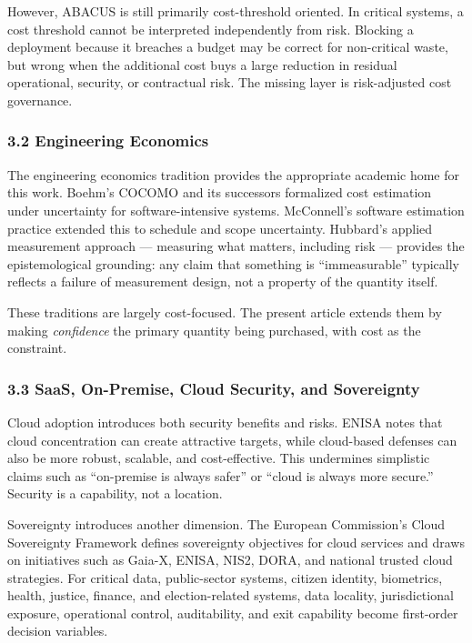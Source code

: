 \documentclass[
]{article}
\begin{document}
However, ABACUS is still primarily cost-threshold oriented. In critical
systems, a cost threshold cannot be interpreted independently from risk.
Blocking a deployment because it breaches a budget may be correct for
non-critical waste, but wrong when the additional cost buys a large
reduction in residual operational, security, or contractual risk. The
missing layer is risk-adjusted cost governance.

\subsubsection{3.2 Engineering Economics}\label{engineering-economics}

The engineering economics tradition provides the appropriate academic
home for this work. Boehm's COCOMO and its successors formalized cost
estimation under uncertainty for software-intensive systems. McConnell's
software estimation practice extended this to schedule and scope
uncertainty. Hubbard's applied measurement approach --- measuring what
matters, including risk --- provides the epistemological grounding: any
claim that something is ``immeasurable'' typically reflects a failure of
measurement design, not a property of the quantity itself.

These traditions are largely cost-focused. The present article extends
them by making \emph{confidence} the primary quantity being purchased,
with cost as the constraint.

\subsubsection{3.3 SaaS, On-Premise, Cloud Security, and
Sovereignty}\label{saas-on-premise-cloud-security-and-sovereignty}

Cloud adoption introduces both security benefits and risks. ENISA notes
that cloud concentration can create attractive targets, while
cloud-based defenses can also be more robust, scalable, and
cost-effective. This undermines simplistic claims such as ``on-premise
is always safer'' or ``cloud is always more secure.'' Security is a
capability, not a location.

Sovereignty introduces another dimension. The European Commission's
Cloud Sovereignty Framework defines sovereignty objectives for cloud
services and draws on initiatives such as Gaia-X, ENISA, NIS2, DORA, and
national trusted cloud strategies. For critical data, public-sector
systems, citizen identity, biometrics, health, justice, finance, and
election-related systems, data locality, jurisdictional exposure,
operational control, auditability, and exit capability become
first-order decision variables.
\end{document}

